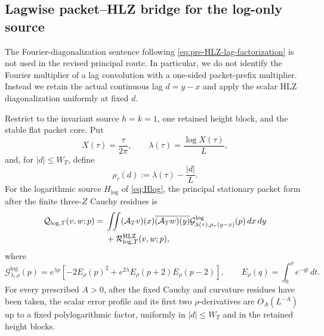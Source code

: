 \subsection{Lagwise packet--HLZ bridge for the log-only source}
\label{sec:lagwise-packet-hlz}

The Fourier-diagonalization sentence following
\eqref{eq:pre-HLZ-lag-factorization} is not used in the revised principal
route.  In particular, we do not identify the Fourier multiplier of a lag
convolution with a one-sided packet-prefix multiplier.  Instead we retain the
actual continuous lag $d=y-x$ and apply the scalar HLZ diagonalization
uniformly at fixed $d$.

\begin{proposition}
\label{prop:lagwise-packet-HLZ}
Restrict to the invariant source $h=k=1$, one retained height block, and the
stable flat packet core.  Put
\[
X(\tau)=\frac{\tau}{2\pi},\qquad
\lambda(\tau)=\frac{\log X(\tau)}L,
\]
and, for $|d|\le W_T$, define
\begin{equation}
\boxed{
\rho_\tau(d):=\lambda(\tau)-\frac{|d|}{L}.
}
\label{eq:lagwise-rho}
\end{equation}
For the logarithmic source $H_{\log}$ of \eqref{eq:Hlog}, the principal
stationary packet form after the finite three-$Z$ Cauchy residues is
\begin{align}
\mathcal Q_{\log,T}(v,w;p)
={}&\iint
 (\mathcal A_Tv)(x)\overline{(\mathcal A_Tw)(y)}
 \mathcal G^{\log}_{\lambda(\tau),\rho_\tau(y-x)}(p)\,dx\,dy
\notag\\
&+\mathcal R^{\rm HLZ}_{\log,T}(v,w;p),
\label{eq:lagwise-HLZ-form}
\end{align}
where
\begin{equation}
\boxed{
\mathcal G^{\log}_{\lambda,\rho}(p)
=e^{\lambda p}\left[
-2E_\rho(p)^2
+e^{2\lambda}E_\rho(p+2)E_\rho(p-2)
\right],
\qquad
E_\rho(q)=\int_0^\rho e^{-qt}\,dt.
}
\label{eq:logonly-local-profile}
\end{equation}
For every prescribed $A>0$, after the fixed Cauchy and curvature residues have
been taken, the scalar error profile and its first two $\rho$-derivatives are
$O_A(L^{-A})$ up to a fixed polylogarithmic factor, uniformly in
$|d|\le W_T$ and in the retained height blocks.
\end{proposition}

